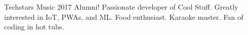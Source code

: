 \documentclass[]{friggeri-cv}
\begin{document}
Techstars Music 2017 Alumni! Passionate developer of Cool Stuff\texttrademark. Greatly interested in IoT, PWAs, and ML. Food enthusiast. Karaoke master. Fan of coding in hot tubs.

% 
\end{document}
